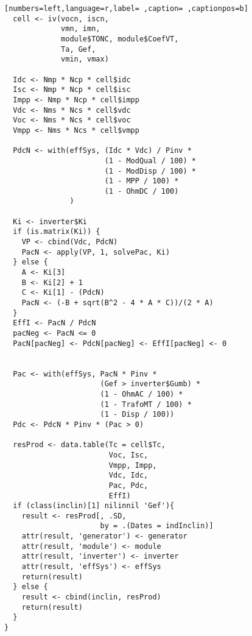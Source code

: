 \begin{lstlisting}[numbers=left,language=r,label= ,caption= ,captionpos=b]
  cell <- iv(vocn, iscn,
             vmn, imn,
             module$TONC, module$CoefVT,
             Ta, Gef,
             vmin, vmax)

  Idc <- Nmp * Ncp * cell$idc
  Isc <- Nmp * Ncp * cell$isc
  Impp <- Nmp * Ncp * cell$impp
  Vdc <- Nms * Ncs * cell$vdc
  Voc <- Nms * Ncs * cell$voc
  Vmpp <- Nms * Ncs * cell$vmpp

  PdcN <- with(effSys, (Idc * Vdc) / Pinv *
                       (1 - ModQual / 100) *
                       (1 - ModDisp / 100) *
                       (1 - MPP / 100) *
                       (1 - OhmDC / 100)
               ) 

  Ki <- inverter$Ki
  if (is.matrix(Ki)) { 
    VP <- cbind(Vdc, PdcN)
    PacN <- apply(VP, 1, solvePac, Ki)
  } else { 
    A <- Ki[3]
    B <- Ki[2] + 1
    C <- Ki[1] - (PdcN)
    PacN <- (-B + sqrt(B^2 - 4 * A * C))/(2 * A)
  }
  EffI <- PacN / PdcN
  pacNeg <- PacN <= 0
  PacN[pacNeg] <- PdcN[pacNeg] <- EffI[pacNeg] <- 0


  Pac <- with(effSys, PacN * Pinv *
                      (Gef > inverter$Gumb) *
                      (1 - OhmAC / 100) *
                      (1 - TrafoMT / 100) *
                      (1 - Disp / 100))
  Pdc <- PdcN * Pinv * (Pac > 0)

  resProd <- data.table(Tc = cell$Tc,
                        Voc, Isc,
                        Vmpp, Impp,
                        Vdc, Idc,
                        Pac, Pdc,
                        EffI)
  if (class(inclin)[1] nilinnil 'Gef'){
    result <- resProd[, .SD,
                      by = .(Dates = indInclin)]
    attr(result, 'generator') <- generator
    attr(result, 'module') <- module
    attr(result, 'inverter') <- inverter
    attr(result, 'effSys') <- effSys
    return(result)
  } else {
    result <- cbind(inclin, resProd)
    return(result)
  }
}
\end{lstlisting}
